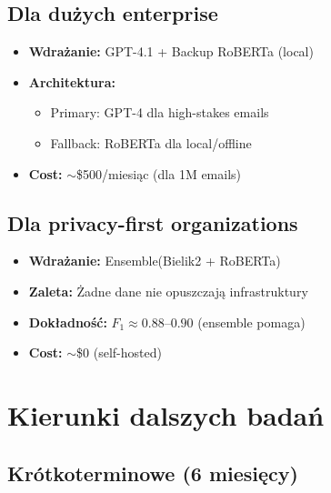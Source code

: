 \documentclass[11pt]{extreport}
\begin{document}
\subsection{Dla dużych enterprise}
\begin{itemize}
    \item \textbf{Wdrażanie:} GPT-4.1 + Backup RoBERTa (local)
    \item \textbf{Architektura:}
    \begin{itemize}
        \item Primary: GPT-4 dla high-stakes emails
        \item Fallback: RoBERTa dla local/offline
    \end{itemize}
    \item \textbf{Cost:} $\sim$\$500/miesiąc (dla 1M emails)
\end{itemize}

\subsection{Dla privacy-first organizations}
\begin{itemize}
    \item \textbf{Wdrażanie:} Ensemble(Bielik2 + RoBERTa)
    \item \textbf{Zaleta:} Żadne dane nie opuszczają infrastruktury
    \item \textbf{Dokładność:} $F_1 \approx 0.88$--$0.90$ (ensemble pomaga)
    \item \textbf{Cost:} $\sim$\$0 (self-hosted)
\end{itemize}

\section{Kierunki dalszych badań}
\label{sec:kierunki-badan}

\subsection{Krótkoterminowe (6 miesięcy)}
\end{document}
